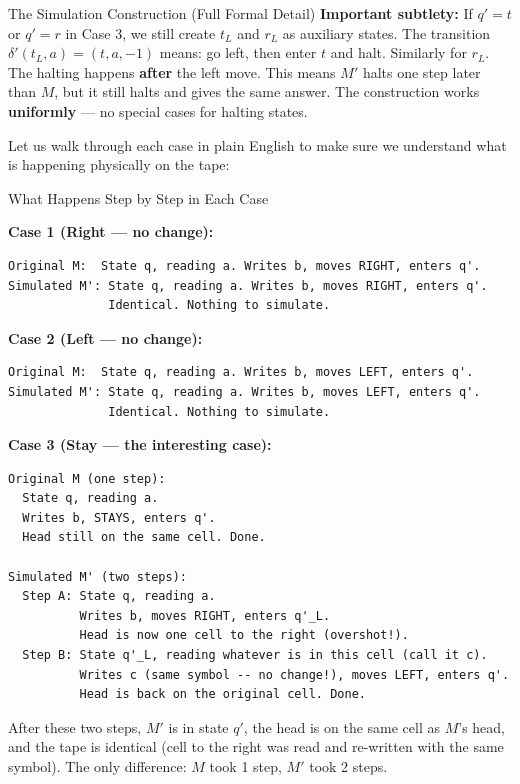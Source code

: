 \begin{definitionbox}{{The Simulation Construction (Full Formal Detail) \kemark}}
\textbf{Important subtlety:} If $q' = t$ or $q' = r$ in Case 3, we still create $t_L$ and $r_L$ as auxiliary states. The transition $\delta'(t_L, a) = (t, a, -1)$ means: go left, then enter $t$ and halt. Similarly for $r_L$. The halting happens \textbf{after} the left move. This means $M'$ halts one step later than $M$, but it still halts and gives the same answer. The construction works \textbf{uniformly} --- no special cases for halting states.
\end{definitionbox}

Let us walk through each case in plain English to make sure we understand what is happening physically on the tape:

\begin{examplebox}{{What Happens Step by Step in Each Case}}

\textbf{Case 1 (Right --- no change):}
\begin{lstlisting}
Original M:  State q, reading a. Writes b, moves RIGHT, enters q'.
Simulated M': State q, reading a. Writes b, moves RIGHT, enters q'.
              Identical. Nothing to simulate.
\end{lstlisting}

\textbf{Case 2 (Left --- no change):}
\begin{lstlisting}
Original M:  State q, reading a. Writes b, moves LEFT, enters q'.
Simulated M': State q, reading a. Writes b, moves LEFT, enters q'.
              Identical. Nothing to simulate.
\end{lstlisting}

\textbf{Case 3 (Stay --- the interesting case):}
\begin{lstlisting}
Original M (one step):
  State q, reading a.
  Writes b, STAYS, enters q'.
  Head still on the same cell. Done.

Simulated M' (two steps):
  Step A: State q, reading a.
          Writes b, moves RIGHT, enters q'_L.
          Head is now one cell to the right (overshot!).
  Step B: State q'_L, reading whatever is in this cell (call it c).
          Writes c (same symbol -- no change!), moves LEFT, enters q'.
          Head is back on the original cell. Done.
\end{lstlisting}

After these two steps, $M'$ is in state $q'$, the head is on the same cell as $M$'s head, and the tape is identical (cell to the right was read and re-written with the same symbol). The only difference: $M$ took 1 step, $M'$ took 2 steps.
\end{examplebox}



